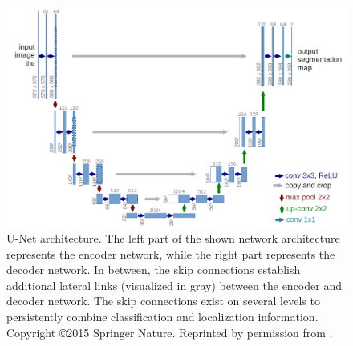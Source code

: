 \begin{figure}
	\includegraphics[width=\linewidth]{figures/chap223_unet.png}
	\caption[U-Net]{
		U-Net architecture. The left part of the shown network architecture represents the encoder network, while the right part represents the decoder network. 
		In between, the skip connections establish additional lateral links (visualized in gray) between the encoder and decoder network. 
		The skip connections exist on several levels to persistently combine classification and localization information. 
		Copyright \copyright 2015 Springer Nature. Reprinted by permission from \cite{RF15-U-Net}.}
	\label{fig:ch2:sec2:unet}
\end{figure}


